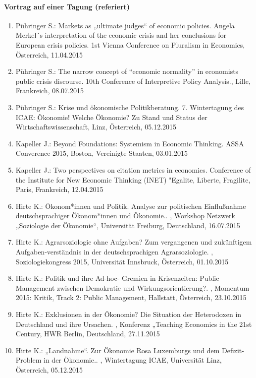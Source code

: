 \paragraph{Vortrag auf einer Tagung (referiert)}
\begin{enumerate}
	\item Pühringer S.: Markets as „ultimate judges“ of economic policies. Angela Merkel´s interpretation of the economic crisis and her conclusions for European crisis policies. 1st Vienna Conference on Pluralism in Economics, Österreich, 11.04.2015
	\item Pühringer S.: The narrow concept of “economic normality” in economists public crisis discourse. 10th Conference of Interpretive Policy Analysis., Lille, Frankreich, 08.07.2015
	\item Pühringer S.: Krise und ökonomische Politikberatung. 7. Wintertagung des ICAE: Ökonomie! Welche Ökonomie? Zu Stand und Status der Wirtschaftswissenschaft, Linz, Österreich, 05.12.2015
	\item Kapeller J.: Beyond Foundations: Systemism in Economic Thinking. ASSA Converence 2015, Boston, Vereinigte Staaten, 03.01.2015
	\item Kapeller J.: Two perspectives on citation metrics in economics. Conference of the Institute for New Economic Thinking (INET) "Egalite, Liberte, Fragilite, Paris, Frankreich, 12.04.2015
	\item Hirte K.: Ökonom*innen und Politik. Analyse zur politischen Einflußnahme deutschsprachiger Ökonom*innen und Ökonomie.. , Workshop Netzwerk „Soziologie der Ökonomie“, Universität Freiburg, Deutschland, 16.07.2015
	\item Hirte K.: Agrarsoziologie ohne Aufgaben?  Zum vergangenen und zukünftigem Aufgaben-verständnis in der deutschsprachigen Agrarsoziologie. , Soziologiekongress 2015, Universität Innsbruck, Österreich, 01.10.2015
	\item Hirte K.: Politik und ihre Ad-hoc- Gremien in Krisenzeiten: Public Management zwischen Demokratie und Wirkungsorientierung?. , Momentum 2015: Kritik, Track 2: Public Management, Hallstatt, Österreich, 23.10.2015
	\item Hirte K.: Exklusionen in der Ökonomie? Die Situation der Heterodoxen in Deutschland und ihre Ursachen. , Konferenz „Teaching Economics in the 21st Century, HWR Berlin, Deutschland, 27.11.2015
	\item Hirte K.: „Landnahme“. Zur Ökonomie Rosa Luxemburgs und dem Defizit-Problem in der Ökonomie.. , Wintertagung ICAE, Universität Linz, Österreich, 05.12.2015

\end{enumerate}
